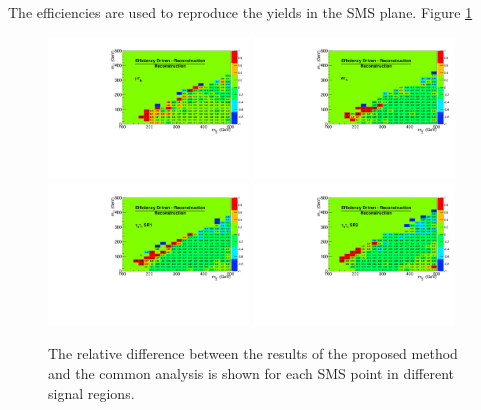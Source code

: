 The efficiencies are used to reproduce the yields in the SMS plane. 
Figure \ref{fig:NormalizedDiff}
\begin{figure}[!Hhtb]
\centering
\includegraphics[width=0.475\textwidth,keepaspectratio=true]{ModelTesting/NormalizedDiffmuTau.pdf}
\includegraphics[width=0.475\textwidth,keepaspectratio=true]{ModelTesting/NormalizedDiffeleTau.pdf}
\includegraphics[width=0.475\textwidth,keepaspectratio=true]{ModelTesting/NormalizedDiffTauTauBin1.pdf}
\includegraphics[width=0.475\textwidth,keepaspectratio=true]{ModelTesting/NormalizedDiffTauTauBin2.pdf}
\caption{The relative difference between the results of the proposed method and the common analysis is shown for each SMS point in different signal regions.}
\label{fig:NormalizedDiff}
\end{figure}
